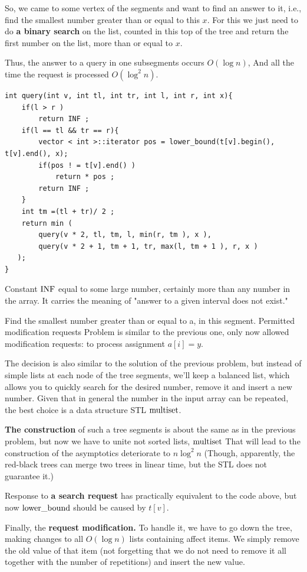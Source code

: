 So, we came to some vertex of the segments and want to find an answer to it, i.e., find the smallest number greater than or equal to this $x$. For this we just need to do \textbf{a binary search} on the list, counted in this top of the tree and return the first number on the list, more than or equal to $x$.

Thus, the answer to a query in one subsegments occurs $O (\log n)$, And all the time the request is processed $O (\log ^ 2 n)$.

\begin{verbatim}
int query(int v, int tl, int tr, int l, int r, int x){
    if(l > r )
        return INF ;
    if(l == tl && tr == r){
        vector < int >::iterator pos = lower_bound(t[v].begin(), t[v].end(), x);
        if(pos ! = t[v].end() )
            return * pos ;
        return INF ;
    }
    int tm =(tl + tr)/ 2 ;
    return min (
        query(v * 2, tl, tm, l, min(r, tm ), x ),
        query(v * 2 + 1, tm + 1, tr, max(l, tm + 1 ), r, x )
   );
} 
\end{verbatim}
Constant $\rm INF$ equal to some large number, certainly more than any number in the array. It carries the meaning of "answer to a given interval does not exist."

Find the smallest number greater than or equal to a, in this segment. Permitted modification requests
Problem is similar to the previous one, only now allowed modification requests: to process assignment $a [i] = y$.

The decision is also similar to the solution of the previous problem, but instead of simple lists at each node of the tree segments, we'll keep a balanced list, which allows you to quickly search for the desired number, remove it and insert a new number. Given that in general the number in the input array can be repeated, the best choice is a data structure STL $\rm multiset$.

\textbf{The construction} of such a tree segments is about the same as in the previous problem, but now we have to unite not sorted lists, $\rm multiset$ That will lead to the construction of the asymptotics deteriorate to $n \log ^ 2 n$ (Though, apparently, the red-black trees can merge two trees in linear time, but the STL does not guarantee it.)

Response to \textbf{a search request} has practically equivalent to the code above, but now $\rm lower \_bound$ should be caused by $t [v]$.

Finally, the \textbf{request modification.} To handle it, we have to go down the tree, making changes to all $O (\log n)$ lists containing affect items. We simply remove the old value of that item (not forgetting that we do not need to remove it all together with the number of repetitions) and insert the new value.

